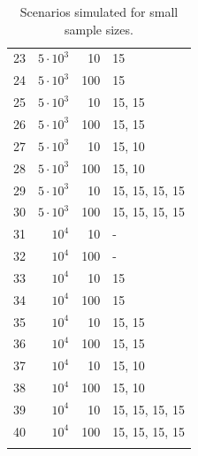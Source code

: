 \documentclass[11pt]{report}
\begin{document}
\begin{longtable}{rrrl}
23 & $5 \cdot 10^3$ & 10 & 15 \\ 
24 & $5 \cdot 10^3$ & 100 & 15 \\ 
25 & $5 \cdot 10^3$ & 10 & 15, 15 \\ 
26 & $5 \cdot 10^3$ & 100 & 15, 15 \\ 
27 & $5 \cdot 10^3$ & 10 & 15, 10 \\ 
28 & $5 \cdot 10^3$ & 100 & 15, 10 \\ 
29 & $5 \cdot 10^3$ & 10 & 15, 15, 15, 15 \\ 
30 & $5 \cdot 10^3$ & 100 & 15, 15, 15, 15 \\ 
\hline
\hline
31 & $10^4$ & 10 & -  \\ 
32 & $10^4$ & 100 & -  \\ 
33 & $10^4$ & 10 & 15 \\ 
34 & $10^4$ & 100 & 15 \\ 
35 & $10^4$ & 10 & 15, 15 \\ 
36 & $10^4$ & 100 & 15, 15 \\ 
37 & $10^4$ & 10 & 15, 10 \\ 
38 & $10^4$ & 100 & 15, 10 \\ 
39 & $10^4$ & 10 & 15, 15, 15, 15 \\ 
40 & $10^4$ & 100 & 15, 15, 15, 15 \\ 
\hline
\caption{Scenarios simulated for small sample sizes.} 
\label{scenarios_sim}
\end{longtable}



\newpage
\end{document}
